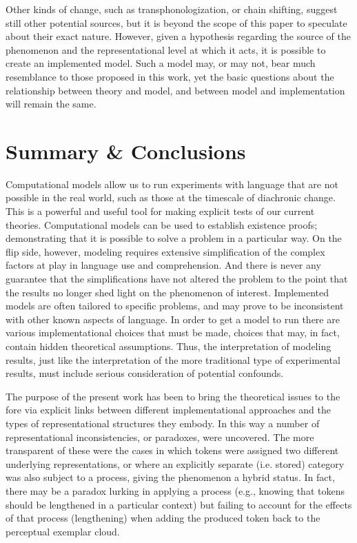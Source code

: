 Other kinds of change, such as transphonologization, or chain shifting,
suggest still other potential sources, but it is beyond the scope
of this paper to speculate about their exact nature. However, given
a hypothesis regarding the source of the phenomenon and the representational
level at which it acts, it is possible to create an implemented model.
Such a model may, or may not, bear much resemblance to those proposed
in this work, yet the basic questions about the relationship between
theory and model, and between model and implementation will remain
the same. 

\section{Summary \& Conclusions}

Computational models allow us to run experiments with language that
are not possible in the real world, such as those at the timescale
of diachronic change. This is a powerful and useful tool for making
explicit tests of our current theories. Computational models can be
used to establish existence proofs; demonstrating that it is possible
to solve a problem in a particular way. On the flip side, however,
modeling requires extensive simplification of the complex factors
at play in language use and comprehension. And there is never any
guarantee that the simplifications have not altered the problem to
the point that the results no longer shed light on the phenomenon
of interest. Implemented models are often tailored to specific problems,
and may prove to be inconsistent with other known aspects of language.
In order to get a model to run there are various implementational
choices that must be made, choices that may, in fact, contain hidden
theoretical assumptions. Thus, the interpretation of modeling results,
just like the interpretation of the more traditional type of experimental
results, must include serious consideration of potential confounds. 

The purpose of the present work has been to bring the theoretical
issues to the fore via explicit links between different implementational
approaches and the types of representational structures they embody.
In this way a number of representational inconsistencies, or paradoxes,
were uncovered. The more transparent of these were the cases in which
tokens were assigned two different underlying representations, or
where an explicitly separate (i.e. stored) category was also subject
to a process, giving the phenomenon a hybrid 
status. In fact, there may be a paradox lurking in applying a process
(e.g., knowing that tokens should be lengthened in a particular context)
but failing to account for the effects of that process (lengthening)
when adding the produced token back to the perceptual exemplar cloud. 

